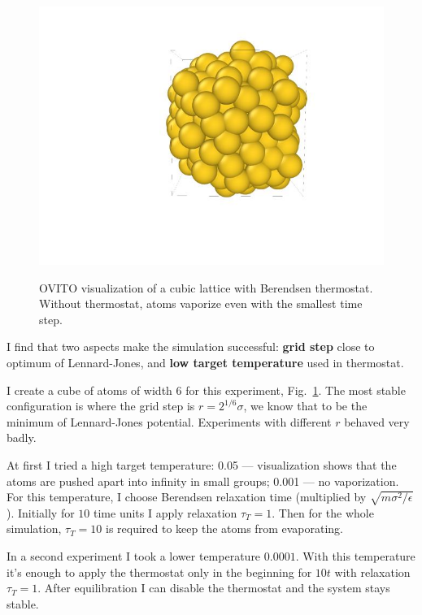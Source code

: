 \documentclass[12pt,a4paper]{article}
\begin{document}
\begin{figure}[htb]
\begin{minipage}{.3\textwidth}
{			\includegraphics[trim={1.8cm 1.8cm 2.2cm 1cm},clip]{img/sim3.jpg}}
	\end{minipage}
	\caption{OVITO visualization of a cubic lattice with Berendsen thermostat. Without thermostat, atoms vaporize even with the smallest time step.}
	\label{fig:first_simulation_ovito}
\end{figure}

I find that two aspects make the simulation successful: {\bf grid step} close to optimum of Lennard-Jones, and {\bf low target temperature} used in thermostat.

I create a cube of atoms of width 6 for this experiment, Fig.~\ref{fig:first_simulation_ovito}. The most stable configuration is where the grid step is $r = 2^{1/6}\sigma$, we know that to be the minimum of Lennard-Jones potential. Experiments with different $r$ behaved very badly.

At first I tried a high target temperature: 0.05 --- visualization shows that the atoms are pushed apart into infinity in small groups; 0.001 --- no vaporization. For this temperature, I choose Berendsen relaxation time (multiplied by \( \sqrt{m\sigma^2 / \epsilon} \)). Initially for $10$ time units I apply relaxation \( \tau_T = 1 \). Then for the whole simulation, \( \tau_T = 10 \) is required to keep the atoms from evaporating. 

In a second experiment I took a lower temperature $0.0001$. With this temperature it's enough to apply the thermostat only in the beginning for $10t$ with relaxation $\tau_T = 1$. After equilibration I can disable the thermostat and the system stays stable.
\end{document}
